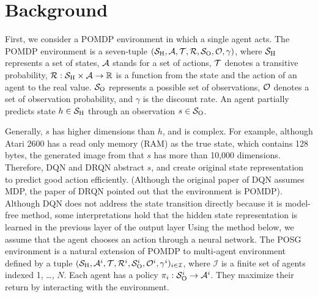 \section{Background}
First, we consider a POMDP environment in which a single agent acts.
The POMDP environment is a seven-tuple $(\S, \A, \Trans, \R, \Observations, \ObProb, \gamma)$,
where $\S$ represents a set of states, $\A$ stands for a set of actions, $\Trans$ denotes a transitive probability, 
$\R: \S \times \A \rightarrow \Real $ is a function from the state and the action of an agent to the real value.
$\Observations$ represents a possible set of observations, $\ObProb$ denotes a set of observation probability, and
$\gamma$ is the discount rate.
An agent partially predicts state $h \in \S$ through an observation $s \in \Observations$.

Generally, $s$ has higher dimensions than $h$, and is complex.
For example, although Atari 2600 has a read only memory (RAM) as the true state, which contains 128 bytes,
the generated image from that $s$ has more than 10,000 dimensions.
Therefore, DQN and DRQN abstract $s$, and create original state representation to predict good action efficiently.
(Although the original paper of DQN assumes MDP, the paper of DRQN pointed out that the environment is POMDP).
Although DQN does not address the state transition directly because it is model-free method, 
some interpretations hold that the hidden state representation is learned in the previous layer of the output layer \citep{zahavy2016graying}
Using the method below, we assume that the agent chooses an action through a neural network.
The POSG environment is a natural extension of POMDP to multi-agent environment defined by a tuple $(\S, \A^i, \Trans, \R^i, \Observations^i, \ObProb^i, \gamma^i)_{i \in \mathcal{I}}$,
where $\mathcal{I}$ is a finite set of agents indexed 1, \dots, $N$.
Each agent has a policy $\pi_i: \Observations^i \rightarrow \A^i$. 
They maximize their return by interacting with the environment.



